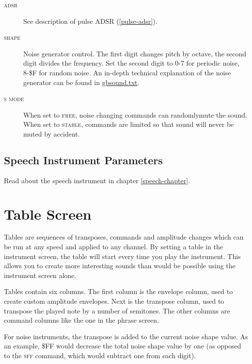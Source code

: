 \begin{description}
	\item[\textsc{adsr}] See description of pulse ADSR (\ref{pulse-adsr}).
	\item[\textsc{shape}] Noise generator control. The first digit changes pitch by octave, the second digit divides the frequency. Set the second digit to 0-7 for periodic noise, 8-\$F for random noise.
        An in-depth technical explanation of the noise generator can be found in \href{http://www.devrs.com/gb/files/hosted/GBSOUND.txt}{gbsound.txt}.
	\item[\textsc{s mode}] When set to \textsc{free}, noise changing commands can randomly\footnotemark mute the sound. When set to \textsc{stable}, commands are limited so that sound will never be muted by accident.
\end{description}

\subsection{Speech Instrument Parameters}

Read about the speech instrument in chapter \ref{speech-chapter}.

\section{Table Screen}

Tables are sequences of transposes, commands and amplitude changes which can be run at any speed and applied to any channel. By setting a table in the instrument screen, the table will start every time you play the instrument. This allows you to create more interesting sounds than would be possible using the instrument screen alone.

Tables contain six columns. The first column is the envelope column, used to create custom amplitude envelopes. Next is the transpose column, used to transpose the played note by a number of semitones. The other columns are command columns like the one in the phrase screen.

For noise instruments, the transpose is added to the current noise shape value. As an example, \$FF would decrease the total noise shape value by one (as opposed to the \textsc{sff} command, which would subtract one from each digit).

